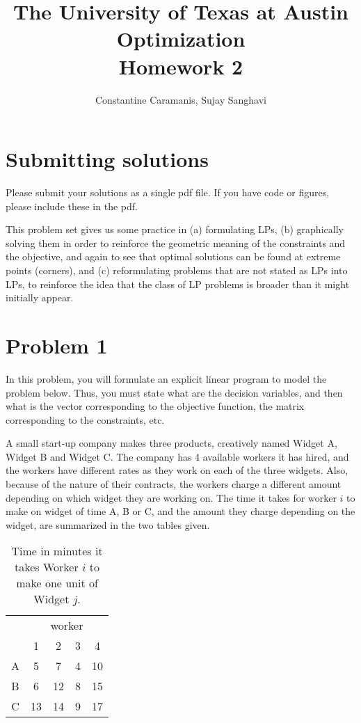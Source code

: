 \documentclass{article}
\title{The University of Texas at Austin\\Optimization\\Homework 2}
\author{Constantine Caramanis, Sujay Sanghavi}
\begin{document}
\maketitle

\section*{Submitting solutions}
Please submit your solutions as a single pdf file. If you have code or figures, please include these in the pdf.

This problem set gives us some practice in (a) formulating LPs, (b) graphically solving them in order to reinforce the geometric meaning of the constraints and the objective, and again to see that optimal solutions can be found at extreme points (corners), and (c) reformulating problems that are not stated as LPs into LPs, to reinforce the idea that the class of LP problems is broader than it might initially appear.

\section{Problem 1}
In this problem, you will formulate an explicit linear program to model the problem below. Thus, you must state what are the decision variables, and then what is the vector corresponding to the objective function, the matrix corresponding to the constraints, etc.

A small start-up company makes three products, creatively named Widget A, Widget B and Widget C. The company has 4 available workers it has hired, and the workers have different rates as they work on each of the three widgets. Also, because of the nature of their contracts, the workers charge a different amount depending on which widget they are working on. The time it takes for worker $i$ to make on widget of time A, B or C, and the amount they charge depending on the widget, are summarized in the two tables given.

\begin{table}[h]
\centering
\begin{tabular}{|c|cccc|}
\hline
\multicolumn{1}{|c|}{} & \multicolumn{4}{c|}{worker} \\
\multicolumn{1}{|c|}{} & 1 & 2 & 3 & 4 \\
\hline
A & 5 & 7 & 4 & 10 \\
B & 6 & 12 & 8 & 15 \\
C & 13 & 14 & 9 & 17 \\
\hline
\end{tabular}
\caption{Time in minutes it takes Worker $i$ to make one unit of Widget $j$.}
\end{table}
\end{document}
